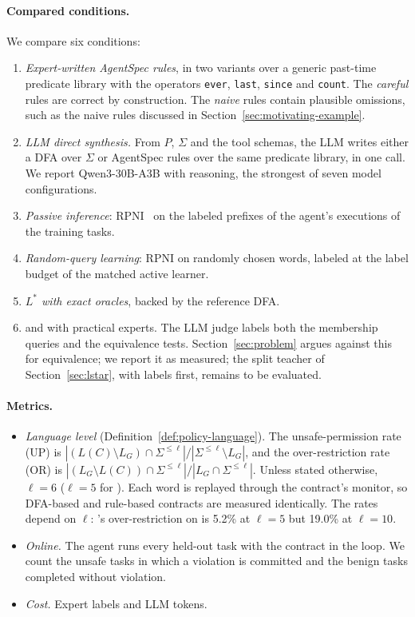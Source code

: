 \paragraph{Compared conditions.}
We compare six conditions:
\begin{enumerate}
  \item \emph{Expert-written AgentSpec rules}, in two variants over a generic past-time predicate library with the
  operators \texttt{ever}, \texttt{last}, \texttt{since} and \texttt{count}. The \emph{careful} rules are correct by construction.
  The \emph{naive} rules contain plausible omissions, such as the naive rules discussed in Section~\ref{sec:motivating-example}.
  \item \emph{LLM direct synthesis.} From $P$, $\Sigma$ and the tool schemas, the LLM writes either a DFA over $\Sigma$
  or AgentSpec rules over the same predicate library, in one call. We report Qwen3-30B-A3B with reasoning, the
  strongest of seven model configurations.
  \item \emph{Passive inference}: RPNI~\cite{oncina1992rpni} on the labeled prefixes of the agent's executions of the training tasks.
  \item \emph{Random-query learning}: RPNI on randomly chosen words, labeled at the label budget of the matched active
  learner.
  \item \emph{$L^*$ with exact oracles}, backed by the reference DFA.
  \item \emph{\system{}} and \emph{\systemR{}} with practical experts. The LLM judge labels both the membership
  queries and the equivalence tests. Section~\ref{sec:problem} argues against this for equivalence; we report it as
  measured; the split teacher of Section~\ref{sec:lstar}, with labels first, remains to be evaluated.
\end{enumerate}

\paragraph{Metrics.}
\begin{itemize}
  \item \emph{Language level} (Definition~\ref{def:policy-language}). The unsafe-permission rate (UP) is
  $|(L(C)\setminus L_G)\cap\Sigma^{\le\ell}|/|\Sigma^{\le\ell}\setminus L_G|$, and the over-restriction rate (OR) is
  $|(L_G\setminus L(C))\cap\Sigma^{\le\ell}|/|L_G\cap\Sigma^{\le\ell}|$. Unless stated otherwise, $\ell=6$ ($\ell=5$ for
  ). Each word is replayed through the contract's monitor, so DFA-based and rule-based contracts are measured
  identically. The rates depend on $\ell$: \systemR{}'s over-restriction on  is 5.2\% at $\ell=5$ but
  19.0\% at $\ell=10$.
  \item \emph{Online.} The agent runs every held-out task with the contract in the loop. We count the unsafe tasks in
  which a violation is committed and the benign tasks completed without violation.
  \item \emph{Cost.} Expert labels and LLM tokens.
\end{itemize}

